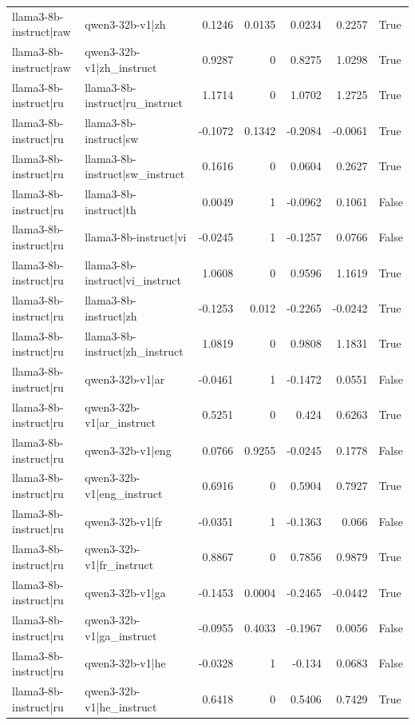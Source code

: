\begin{table}
\begin{tabular}{l l r r r r l}
llama3-8b-instruct|raw & qwen3-32b-v1|zh & 0.1246 & 0.0135 & 0.0234 & 0.2257 & True \\
llama3-8b-instruct|raw & qwen3-32b-v1|zh_instruct & 0.9287 & 0 & 0.8275 & 1.0298 & True \\
llama3-8b-instruct|ru & llama3-8b-instruct|ru_instruct & 1.1714 & 0 & 1.0702 & 1.2725 & True \\
llama3-8b-instruct|ru & llama3-8b-instruct|sw & -0.1072 & 0.1342 & -0.2084 & -0.0061 & True \\
llama3-8b-instruct|ru & llama3-8b-instruct|sw_instruct & 0.1616 & 0 & 0.0604 & 0.2627 & True \\
llama3-8b-instruct|ru & llama3-8b-instruct|th & 0.0049 & 1 & -0.0962 & 0.1061 & False \\
llama3-8b-instruct|ru & llama3-8b-instruct|vi & -0.0245 & 1 & -0.1257 & 0.0766 & False \\
llama3-8b-instruct|ru & llama3-8b-instruct|vi_instruct & 1.0608 & 0 & 0.9596 & 1.1619 & True \\
llama3-8b-instruct|ru & llama3-8b-instruct|zh & -0.1253 & 0.012 & -0.2265 & -0.0242 & True \\
llama3-8b-instruct|ru & llama3-8b-instruct|zh_instruct & 1.0819 & 0 & 0.9808 & 1.1831 & True \\
llama3-8b-instruct|ru & qwen3-32b-v1|ar & -0.0461 & 1 & -0.1472 & 0.0551 & False \\
llama3-8b-instruct|ru & qwen3-32b-v1|ar_instruct & 0.5251 & 0 & 0.424 & 0.6263 & True \\
llama3-8b-instruct|ru & qwen3-32b-v1|eng & 0.0766 & 0.9255 & -0.0245 & 0.1778 & False \\
llama3-8b-instruct|ru & qwen3-32b-v1|eng_instruct & 0.6916 & 0 & 0.5904 & 0.7927 & True \\
llama3-8b-instruct|ru & qwen3-32b-v1|fr & -0.0351 & 1 & -0.1363 & 0.066 & False \\
llama3-8b-instruct|ru & qwen3-32b-v1|fr_instruct & 0.8867 & 0 & 0.7856 & 0.9879 & True \\
llama3-8b-instruct|ru & qwen3-32b-v1|ga & -0.1453 & 0.0004 & -0.2465 & -0.0442 & True \\
llama3-8b-instruct|ru & qwen3-32b-v1|ga_instruct & -0.0955 & 0.4033 & -0.1967 & 0.0056 & False \\
llama3-8b-instruct|ru & qwen3-32b-v1|he & -0.0328 & 1 & -0.134 & 0.0683 & False \\
llama3-8b-instruct|ru & qwen3-32b-v1|he_instruct & 0.6418 & 0 & 0.5406 & 0.7429 & True \\

\end{tabular}
\end{table}
